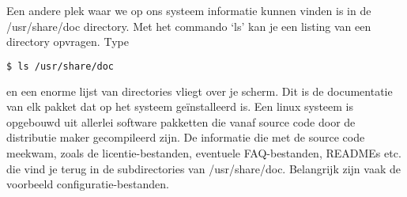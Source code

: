 Een andere plek waar we op ons systeem informatie kunnen vinden is in de /usr/share/doc directory. Met het commando `ls'
kan je een listing van een directory opvragen. Type

\begin{lstlisting}[language=bash]
$ ls /usr/share/doc
\end{lstlisting}

en een enorme lijst van directories vliegt over je scherm. Dit is de documentatie van elk pakket dat op het systeem
ge\"installeerd is. Een linux systeem is opgebouwd uit allerlei software pakketten die vanaf source code door de
distributie maker gecompileerd zijn. De informatie die met de source code meekwam, zoals de licentie-bestanden,
eventuele FAQ-bestanden, READMEs etc. die vind je terug in de subdirectories van /usr/share/doc. Belangrijk zijn vaak
de voorbeeld configuratie-bestanden.
